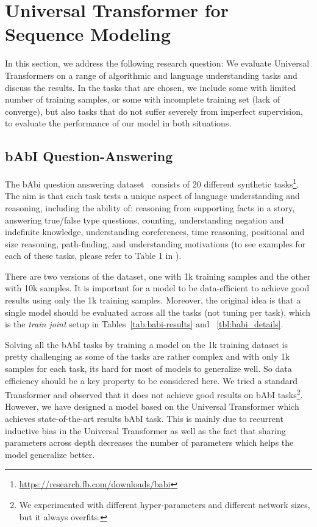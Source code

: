 \section{Universal Transformer for Sequence Modeling}
In this section, we address the following research question:
We evaluate Universal Transformers on a range of algorithmic and language understanding tasks and discuss the results. In the tasks that are chosen, we include some with limited number of training samples, or some with incomplete training set (lack of converge), but also tasks that do not suffer severely from imperfect supervision, to evaluate the performance of our model in both situations. 

\subsection{bAbI Question-Answering}
The bAbi question answering dataset~\citep{weston2015towards} consists of 20 different synthetic tasks\footnote{\url{https://research.fb.com/downloads/babi}}. The aim is that each task tests a unique aspect of language understanding and reasoning, including the ability of: reasoning from supporting facts in a story, answering true/false type questions, counting, understanding negation and indefinite knowledge, understanding coreferences, time reasoning, positional and size reasoning, path-finding, and understanding motivations (to see examples for each of these tasks, please refer to Table 1 in \citep{weston2015towards}).

There are two versions of the dataset, one with 1k training samples and the other with 10k samples. It is important for a model to be data-efficient to achieve good results using only the 1k training samples. Moreover, the original idea is that a single model should be evaluated across all the tasks (not tuning per task), which is the \emph{train joint} setup in Tables~\ref{tab:babi-results} and ~\ref{tbl:babi_details}.

Solving all the bAbI tasks by training a model on the 1k training dataset is pretty challenging as some of the tasks are rather complex and with only 1k samples for each task, its hard for most of models to generalize well. So data efficiency should be a key property to be considered here. 
We tried a standard Transformer and observed that it does not achieve good results on bAbI tasks\footnote{We experimented with different hyper-parameters and different network sizes, but it always overfits.}. However, we have designed a model based on the Universal Transformer which achieves state-of-the-art results bAbI task. 
This is mainly due to recurrent inductive bias in the Universal Transformer as well as the fact that sharing parameters across depth decreases the number of parameters which helps the model generalize better.

